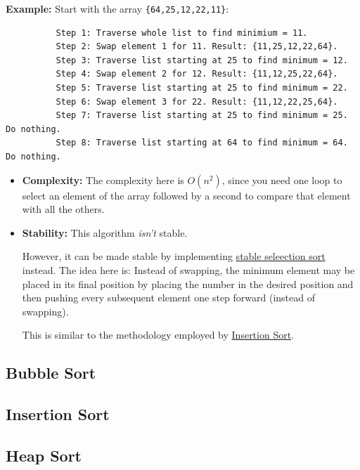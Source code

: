 \documentclass[12pt]{article}
\begin{document}
	\textbf{Example:} Start with the array \texttt{\{64,25,12,22,11\}}: \vspace{-2.25mm}
	\begin{verbatim}
	      Step 1: Traverse whole list to find minimium = 11.
	      Step 2: Swap element 1 for 11. Result: {11,25,12,22,64}.
	      Step 3: Traverse list starting at 25 to find minimum = 12.
	      Step 4: Swap element 2 for 12. Result: {11,12,25,22,64}.
	      Step 5: Traverse list starting at 25 to find minimum = 22.
	      Step 6: Swap element 3 for 22. Result: {11,12,22,25,64}.
	      Step 7: Traverse list starting at 25 to find minimum = 25. Do nothing.
	      Step 8: Traverse list starting at 64 to find minimum = 64. Do nothing.
	\end{verbatim}

	\begin{itemize}[]
		\item \textbf{Complexity:} The complexity here is $O(n^2)$, since you need one loop to select an element of the array followed by a second to compare that element with all the others.
	
		\item \textbf{Stability:} This algorithm \textit{isn't} stable. 
	
		However, it can be made stable by implementing \label{par:StSelSort}\href{https://www.geeksforgeeks.org/stable-selection-sort/}{stable seleection sort} instead. The idea here is: Instead of swapping, the minimum element may be placed in its final position by placing the number in the desired position and then pushing every subsequent element one step forward (instead of swapping).
	
		This is similar to the methodology employed by \hyperref[sec:InsSort]{Insertion Sort}.
	\end{itemize}
	
	\subsection*{Bubble Sort}
	\label{sec:BubSort}
	
	\red{\lipsum[1]}
	
	\subsection*{Insertion Sort}
	\label{sec:InsSort}
	
	\red{\lipsum[1]}
		
	\subsection*{Heap Sort}
	\label{sec:HeapSort}
	
\end{document}
